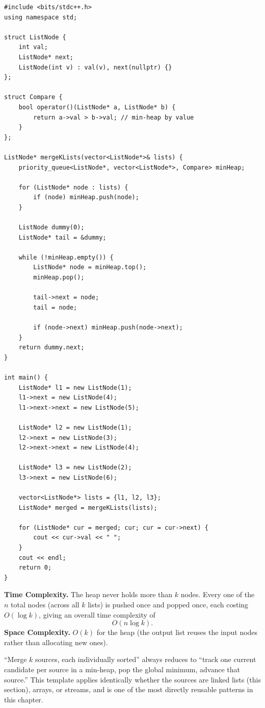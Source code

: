 \begin{lstlisting}
#include <bits/stdc++.h>
using namespace std;

struct ListNode {
    int val;
    ListNode* next;
    ListNode(int v) : val(v), next(nullptr) {}
};

struct Compare {
    bool operator()(ListNode* a, ListNode* b) {
        return a->val > b->val; // min-heap by value
    }
};

ListNode* mergeKLists(vector<ListNode*>& lists) {
    priority_queue<ListNode*, vector<ListNode*>, Compare> minHeap;

    for (ListNode* node : lists) {
        if (node) minHeap.push(node);
    }

    ListNode dummy(0);
    ListNode* tail = &dummy;

    while (!minHeap.empty()) {
        ListNode* node = minHeap.top();
        minHeap.pop();

        tail->next = node;
        tail = node;

        if (node->next) minHeap.push(node->next);
    }
    return dummy.next;
}

int main() {
    ListNode* l1 = new ListNode(1);
    l1->next = new ListNode(4);
    l1->next->next = new ListNode(5);

    ListNode* l2 = new ListNode(1);
    l2->next = new ListNode(3);
    l2->next->next = new ListNode(4);

    ListNode* l3 = new ListNode(2);
    l3->next = new ListNode(6);

    vector<ListNode*> lists = {l1, l2, l3};
    ListNode* merged = mergeKLists(lists);

    for (ListNode* cur = merged; cur; cur = cur->next) {
        cout << cur->val << " ";
    }
    cout << endl;
    return 0;
}
\end{lstlisting}

\begin{complexitybox}
\textbf{Time Complexity.} The heap never holds more than $k$ nodes. Every
one of the $n$ total nodes (across all $k$ lists) is pushed once and
popped once, each costing $O(\log k)$, giving an overall time complexity
of
\[
  O(n \log k).
\]
\textbf{Space Complexity.} $O(k)$ for the heap (the output list reuses
the input nodes rather than allocating new ones).
\end{complexitybox}

\begin{takeawaybox}
``Merge $k$ sources, each individually sorted'' always reduces to ``track
one current candidate per source in a min-heap, pop the global minimum,
advance that source.'' This template applies identically whether the
sources are linked lists (this section), arrays, or streams, and is one of
the most directly reusable patterns in this chapter.
\end{takeawaybox}
